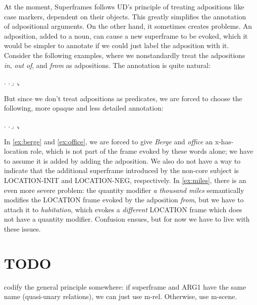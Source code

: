 \documentclass[a4paper]{article}
\newcommand{\fr}[1]{\textsf{#1}}
\newcommand{\rl}[1]{\textsf{#1}}
\begin{document}
At the moment, Superframes follows UD's principle of treating adpositions like
case markers, dependent on their objects. This greatly simplifies the
annotation of adpositional arguments. On the other hand, it sometimes creates
problems. An adposition, added to a noun, can cause a new superframe to be
evoked, which it would be simpler to annotate if we could just label the
adposition with it. Consider the following examples, where we nonstandardly
treat the adpositions \emph{in}, \emph{out of}, and \emph{from} as adpositions.
The annotation is quite natural:

\ex.
\a.
\b.
\c.

But since we don't treat adpositions as predicates, we are forced to choose the following, more opaque and less detailed annotation:

\ex.
\a.\label{ex:berge}
\b.\label{ex:office}
\c.\label{ex:miles}

In \ref{ex:berge} and \ref{ex:office}, we are forced to give \emph{Berge} and
\emph{office} an \rl{x-has-location} role, which is not part of the frame
evoked by these words alone; we have to assume it is added by adding the
adposition. We also do not have a way to indicate that the additional
superframe introduced by the non-core subject is \fr{LOCATION-INIT} and
\fr{LOCATION-NEG}, respectively. In \ref{ex:miles}, there is an even more
severe problem: the quantity modifier \emph{a thousand miles} semantically
modifies the \fr{LOCATION} frame evoked by the adposition \emph{from}, but we
have to attach it to \emph{habitation}, which evokes a \emph{different}
\fr{LOCATION} frame which does not have a quantity modifier. Confusion ensues,
but for now we have to live with these issues.


\newpage\section{TODO}

codify the general principle somewhere: if superframe and ARG1 have the same
name (quasi-unary relations), we can just use m-rel. Otherwise, use m-scene.
\end{document}
